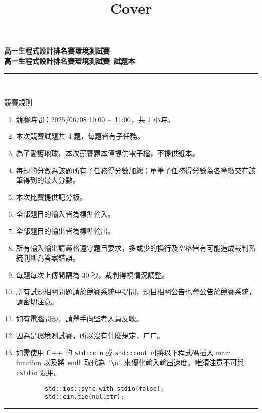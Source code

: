 \documentclass[a4paper]{article}
\title{Cover}
\begin{document}
\begin{center}
\textbf{\huge 高一生程式設計排名賽環境測試賽}\\
\vspace{5mm}
\textbf{\huge 高一生程式設計排名賽環境測試賽\ 試題本}\\
\vspace{10mm}
\rule{17cm}{2pt}\\
\vspace{5mm}

\huge 競賽規則\\
\end{center}

\fontsize{14pt}{20pt}\selectfont
\begin{enumerate}
    \setlength\itemsep{0.5pt}
    \item 競賽時間：2025/06/08 10:00 \textasciitilde \, 11:00，共 1 小時。
    \item 本次競賽試題共 4 題，每題皆有子任務。
    \item 為了愛護地球，本次競賽題本僅提供電子檔，不提供紙本。
    \item 每題的分數為該題所有子任務得分數加總；單筆子任務得分數為各筆繳交在該筆得到的最大分數。
    \item 本次比賽提供記分板。
    \item 全部題目的輸入皆為標準輸入。
    \item 全部題目的輸出皆為標準輸出。
    \item 所有輸入輸出請嚴格遵守題目要求，多或少的換行及空格皆有可能造成裁判系統判斷為答案錯誤。
    \item 每題每次上傳間隔為 30 秒，裁判得視情況調整。
    \item 所有試題相關問題請於競賽系統中提問，題目相關公告也會公告於競賽系統，請密切注意。
    \item 如有電腦問題，請舉手向監考人員反映。
    \item 因為是環境測試賽，所以沒有什麼規定，ㄏㄏ。
    \item 如需使用 C++ 的 \lstinline{std::cin} 或 \lstinline{std::cout} 可將以下程式碼插入 main function 以及將 \lstinline{endl} 取代為 \lstinline{'\n'} 來優化輸入輸出速度。唯須注意不可與 \lstinline{cstdio} 混用。
        \begin{lstlisting}
        std::ios::sync_with_stdio(false);
        std::cin.tie(nullptr);
        \end{lstlisting}

\end{enumerate}

\begin{center}
\rule{17cm}{2pt}\\
\end{center}
\end{document}
